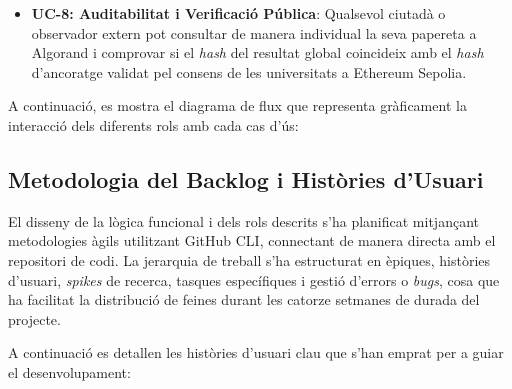 \begin{itemize}
    \item \textbf{UC-8: Auditabilitat i Verificació Pública}: Qualsevol ciutadà o observador extern pot consultar de
    manera individual la seva papereta a Algorand i comprovar si el \textit{hash} del resultat global coincideix amb el
    \textit{hash} d'ancoratge validat pel consens de les universitats a Ethereum Sepolia.
\end{itemize}

A continuació, es mostra el diagrama de flux que representa gràficament la interacció dels diferents rols amb cada cas
d'ús:


\subsection{Metodologia del Backlog i Històries d'Usuari}
\label{subsec:user-stories}

El disseny de la lògica funcional i dels rols descrits s'ha planificat mitjançant metodologies àgils utilitzant GitHub
CLI, connectant de manera directa amb el repositori de codi.
La jerarquia de treball s'ha estructurat en èpiques, històries d'usuari, \textit{spikes} de recerca, tasques
específiques i gestió d'errors o \textit{bugs}, cosa que ha facilitat la distribució de feines durant les catorze
setmanes de durada del projecte.

A continuació es detallen les històries d'usuari clau que s'han emprat per a guiar el desenvolupament:


